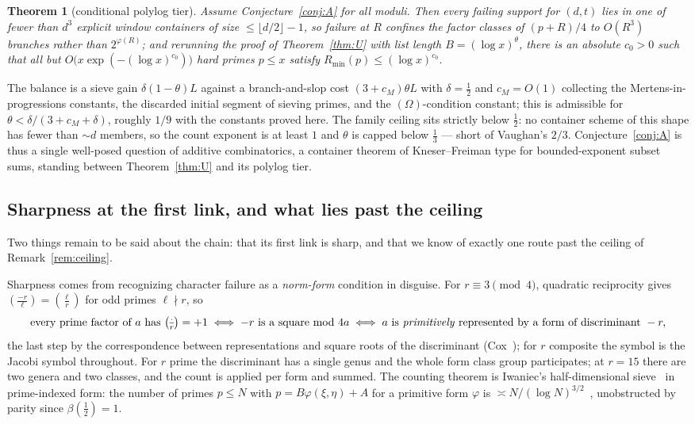 \documentclass[11pt]{article}
\theoremstyle{plain}
\newtheorem{theorem}{Theorem}[section]
\theoremstyle{remark}
\theoremstyle{plain}
\numberwithin{equation}{section}
\newcommand{\legendre}[2]{\genfrac{(}{)}{}{1}{#1}{#2}}
\begin{document}
\begin{theorem}[conditional polylog tier]\label{thm:Upay}
Assume Conjecture~\ref{conj:A} for all moduli. Then every failing
support for $(d, t)$ lies in one of fewer than $d^3$ explicit window
containers of size $\le \lfloor d/2\rfloor - 1$, so failure at $R$
confines the factor classes of $(p+R)/4$ to $O(R^3)$ branches rather
than $2^{\varphi(R)}$; and rerunning the proof of Theorem~\ref{thm:U}
with list length $B = (\log x)^{\theta}$, there is an absolute
$c_0 > 0$ such that all but
$O\bigl(x \exp(-(\log x)^{c_0})\bigr)$ hard primes $p \le x$ satisfy
$R_{\min}(p) \le (\log x)^{c_0}$.
\end{theorem}

The balance is a sieve gain $\delta(1-\theta)L$ against a
branch-and-slop cost $(3 + c_M)\theta L$ with $\delta = \tfrac12$ and
$c_M = O(1)$ collecting the Mertens-in-progressions constants, the
discarded initial segment of sieving primes, and the
$(\Omega)$-condition constant; this is admissible for
$\theta < \delta/(3 + c_M + \delta)$, roughly $1/9$ with the constants
proved here. The family ceiling sits strictly below $\tfrac12$: no
container scheme of this shape has fewer than ${\sim}d$ members, so
the count exponent is at least $1$ and $\theta$ is capped below
$\tfrac13$ --- short of Vaughan's $2/3$. Conjecture~\ref{conj:A} is
thus a single well-posed question of additive combinatorics, a
container theorem of Kneser--Freiman type for bounded-exponent subset
sums, standing between Theorem~\ref{thm:U} and its polylog tier.

\subsection{Sharpness at the first link, and what lies past the
ceiling}\label{sec:ladder}

Two things remain to be said about the chain: that its first link is
sharp, and that we know of exactly one route past the ceiling of
Remark~\ref{rem:ceiling}.

Sharpness comes from recognizing character failure as a
\emph{norm-form} condition in disguise. For $r \equiv 3 \pmod 4$,
quadratic reciprocity gives $\legendre{-r}{\ell} = \legendre{\ell}{r}$
for odd primes $\ell \nmid r$, so
\begin{equation}\label{eq:normform}
  \text{every prime factor of $a$ has } \legendre{\cdot}{r} = +1
  \iff -r \text{ is a square mod } 4a
  \iff a \text{ is \emph{primitively} represented by a form of
  discriminant } -r,
\end{equation}
the last step by the correspondence between representations and square
roots of the discriminant (Cox~\cite[Lem.~2.5]{Cox}); for $r$
composite the symbol is the Jacobi symbol throughout. For $r$ prime
the discriminant has a single genus and the whole form class group
participates; at $r = 15$ there are two genera and two classes, and
the count is applied per form and summed. The counting theorem is
Iwaniec's half-dimensional sieve~\cite{IwaniecHalfDim} in
prime-indexed form: the number of primes $p \le N$ with
$p = B\varphi(\xi,\eta) + A$ for a primitive form $\varphi$ is
$\asymp N/(\log N)^{3/2}$~\cite{IwaniecPhiA}, unobstructed by parity
since $\beta(\tfrac12) = 1$.
\end{document}
